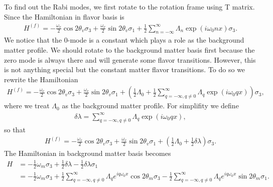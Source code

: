 \documentclass[letterpaper,12pt,english]{sphinxmanual}
\begin{document}
To find out the Rabi modes, we first rotate to the rotation frame using T matrix. Since the Hamiltonian in flavor basis is
\begin{equation*}
\begin{split}H^{(f)} = -\frac{\omega_v}{2} \cos 2\theta_v \sigma_3 + \frac{\omega_v}{2} \sin 2\theta_v \sigma_1  + \frac{1}{2}  \sum_{n=-\infty}^{\infty} \Lambda_n \exp\left( i \omega_0 n x \right) \sigma_3.\end{split}
\end{equation*}
We notice that the 0-mode is a constant which plays a role as the background matter profile. We should rotate to the background matter basis first because the zero mode is always there and will generate some flavor transitions. However, this is not anything special but the constant matter flavor transitions.  To do so we rewrite the Hamiltonian
\begin{equation*}
\begin{split}H^{(f)} = -\frac{\omega_v}{2} \cos 2\theta_v \sigma_3 + \frac{\omega_v}{2} \sin 2\theta_v \sigma_1  + \left( \frac{1}{2}\Lambda_0  + \frac{1}{2}  \sum_{q=-\infty, q\neq 0}^{\infty} \Lambda_q \exp\left( i \omega_0 q x \right) \right) \sigma_3,\end{split}
\end{equation*}
where we treat \(\Lambda_0\) as the background matter profile. For simplifity we define
\begin{equation*}
\begin{split}\delta \lambda =  \sum_{q=-\infty, q\neq 0}^{\infty} \Lambda_q \exp\left( i \omega_0 q x \right),\end{split}
\end{equation*}
so that
\begin{equation*}
\begin{split}H^{(f)} = -\frac{\omega_v}{2} \cos 2\theta_v \sigma_3 + \frac{\omega_v}{2} \sin 2\theta_v \sigma_1  + \left( \frac{1}{2}\Lambda_0  + \frac{1}{2}  \delta \lambda \right) \sigma_3.\end{split}
\end{equation*}
The Hamiltonian in background matter basis becomes
\begin{equation*}
\begin{split}H &= - \frac{1}{2}\omega_m \sigma_3 + \frac{1}{2} \delta\lambda - \frac{1}{2} \delta \lambda \sigma_1 \\
&= - \frac{1}{2}\omega_m \sigma_3  + \frac{1}{2} \sum_{q=-\infty, q\neq 0}^{\infty} \Lambda_q e^{i q \omega_0 x} \cos 2\theta_m \sigma_3 - \frac{1}{2} \sum_{q=-\infty, q\neq 0}^{\infty} \Lambda_q e^{i q \omega_0 x} \sin 2\theta_m \sigma_1.\end{split}
\end{equation*}
\end{document}
